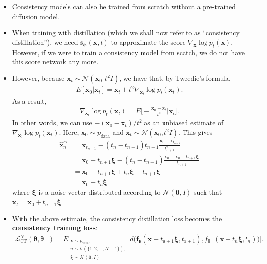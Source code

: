 \documentclass[10pt]{article}
\newcommand{\ve}[1]{\mathbf{#1}}
\newcommand{\ves}[1]{\boldsymbol{#1}}
\newcommand{\mrm}[1]{\mathrm{#1}}
\newcommand{\mcal}[1]{\mathcal{#1}}
\newcommand{\data}{\mathrm{data}}
\begin{document}
\begin{itemize}
  \item Consistency models can also be trained from scratch without a pre-trained diffusion model.
  
  \item When training with distillation (which we shall now refer to as ``consistency distillation''), we need $\ve{s}_{\ves{\phi}}(\ve{x},t)$ to approximate the score $\nabla_{\ve{x}} \log p_t(\ve{x})$. However, if we were to train a consistency model from scatch, we do not have this score network any more.
  
  \item However, because $\ve{x}_t \sim \mcal{N}(\ve{x}_0, t^2 I)$, we have that, by Tweedie's formula,
  \begin{align*}
    E[\ve{x}_0 | \ve{x}_t] = \ve{x}_t + t^2 \nabla_{\ve{x}_t} \log p_t(\ve{x}_t).
  \end{align*}
  As a result,
  \begin{align*}
    \nabla_{\ve{x}_t} \log p_t(\ve{x}_t) = E\bigg[ -\frac{\ve{x}_0 - \ve{x}_t}{t^2} \bigg| \ve{x}_t \bigg].
  \end{align*}
  In other words, we can use $-(\ve{x}_0 - \ve{x}_t) / t^2$ as an unbiased estimate of $\nabla_{\ve{x}_t} \log p_t(\ve{x}_t)$. Here, $\ve{x}_0 \sim p_{\data}$ and $\ve{x}_t \sim \mcal{N}(\ve{x}_0, t^2I)$. This gives
  \begin{align*}
    \hat{\ve{x}}_{n}^{\ves{\phi}} 
    &= \ve{x}_{t_{n+1}} - (t_{n} - t_{n+1}) t_{n+1} \frac{\ve{x}_0 - \ve{x}_{t_{n+1}}}{t_{n+1}^2} \\
    &= \ve{x}_0 + t_{n+1}\ves{\xi} - (t_n - t_{n+1}) \frac{\ve{x}_0 - \ve{x}_0 - t_{n+1}\ves{\xi}}{t_{n+1}} \\
    &= \ve{x}_0 + t_{n+1}\ves{\xi} + t_n \ves{\xi} - t_{n+1} \ves{\xi}\\
    &= \ve{x}_0 + t_{n}\ves{\xi}
  \end{align*}  
  where $\ves{\xi}$ is a noise vector distributed according to $\mcal{N}(\ve{0},I)$ such that $\ve{x}_t = \ve{x}_0 + t_{n+1} \ves{\xi}$.

  \item With the above estimate, the consistency distillation loss becomes the {\bf consistency training loss}:
  \begin{align*}
    \mcal{L}^N_{\mrm{CT}}(\ves{\theta}, \ves{\theta}^-) = E_{\substack{\ve{x} \sim p_{\data}, \\ n \sim \mcal{U}(\{1, 2, \dotsc, N-1 \}), \\ \ves{\xi} \sim \mcal{N}(\ve{0}, I)}} \Big[ d\big(\ve{f}_{\ves{\theta}}(\ve{x} + t_{n+1}\ves{\xi}, t_{n+1}), f_{\ves{\theta}^-}(\ve{x} + t_{n} \ves{\xi}, t_n)\big) \Big].
  \end{align*}


\end{itemize}
\end{document}

